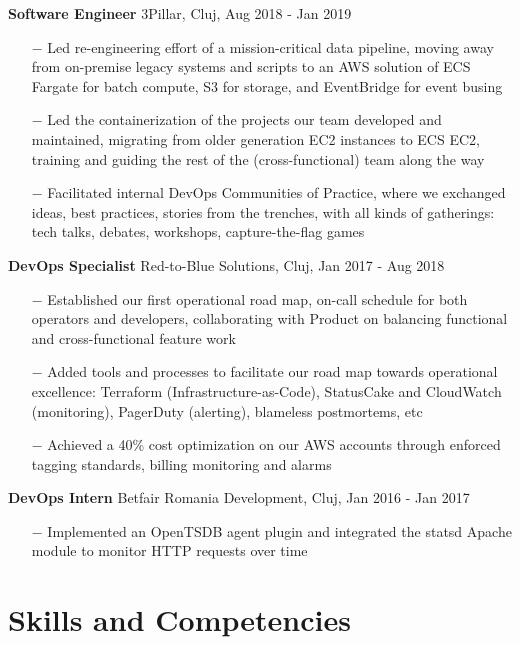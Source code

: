 \documentclass{article}
\begin{document}
\textbf{Software Engineer} \hfill 3Pillar, Cluj, Aug 2018 - Jan 2019

\begin{itemize}
    \item[$-$] Led re-engineering effort of a mission-critical data pipeline, moving away from on-premise legacy systems and scripts to an AWS solution of ECS Fargate for batch compute, S3 for storage, and EventBridge for event busing
    \item[$-$] Led the containerization of the projects our team developed and maintained, migrating from older generation EC2 instances to ECS EC2, training and guiding the rest of the (cross-functional) team along the way
    \item[$-$] Facilitated internal DevOps Communities of Practice, where we exchanged ideas, best practices, stories from the trenches, with all kinds of gatherings: tech talks, debates, workshops, capture-the-flag games
\end{itemize}

\textbf{DevOps Specialist} \hfill Red-to-Blue Solutions, Cluj, Jan 2017 - Aug 2018
\begin{itemize}
    \item[$-$] Established our first operational road map, on-call schedule for both operators and developers, collaborating with Product on balancing functional and cross-functional feature work
    \item[$-$] Added tools and processes to facilitate our road map towards operational excellence: Terraform (Infrastructure-as-Code), StatusCake and CloudWatch (monitoring), PagerDuty (alerting), blameless postmortems, etc
    \item[$-$] Achieved a 40\% cost optimization on our AWS accounts through enforced tagging
standards, billing monitoring and alarms
\end{itemize}

\textbf{DevOps Intern} \hfill Betfair Romania Development, Cluj, Jan 2016 - Jan 2017

\begin{itemize}
    \item[$-$] Implemented an OpenTSDB agent plugin and integrated the statsd Apache module to monitor HTTP requests over time
\end{itemize}


\section*{Skills and Competencies}
\indent
\end{document}
